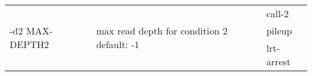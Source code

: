 {\small
\begin{tabular}{@{}p{}p{}l@{}}
\multirow{3}{=}{-d2 MAX-DEPTH2} & \multirow{3}{=}{max read depth for condition 2
default: -1} & call-2 \\
 &  & pileup \\
 &  & lrt-arrest \\
\end{tabular}\\
}
